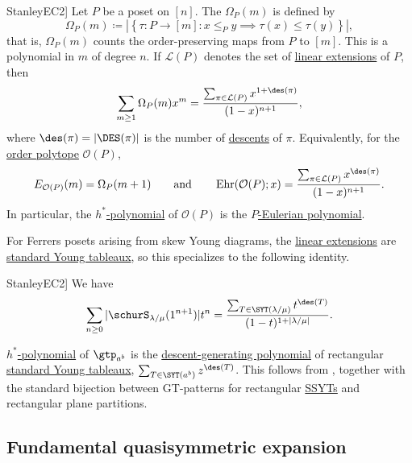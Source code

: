 \begin{proposition}[See \cite[Ch.~7.19]{StanleyEC2}]
Let $P$ be a poset on $[n]$.
The \label{orderPolynomial} $\Omega_P(m)$ is defined by
\[
\Omega_P(m) \coloneqq
\left| \left\{ \tau:P\to [m] : x \leq_P y \implies
\tau(x)\leq \tau(y) \right\}\right|,
\]
that is, $\Omega_P(m)$ counts the order-preserving maps from $P$ to $[m]$.
This is a polynomial in $m$ of degree $n$.
If $\mathcal{L}(P)$ denotes the set of
\hyperref[linearExtension]{linear extensions} of $P$, then
\[
\sum_{m\geq 1} \Omega_P(m) x^m
=
\frac{\sum_{\pi \in \mathcal{L}(P)} x^{1+\des(\pi)}}{(1-x)^{n+1}},
\]
where $\des(\pi)=|\DES(\pi)|$ is the number of
\hyperref[descentSet]{descents} of $\pi$.
Equivalently, for the \hyperref[orderPolytope]{order polytope} $\mathcal{O}(P)$,
\[
E_{\mathcal{O}(P)}(m)=\Omega_P(m+1)
\qquad \text{and} \qquad
\operatorname{Ehr}(\mathcal{O}(P);x)
=
\frac{\sum_{\pi \in \mathcal{L}(P)} x^{\des(\pi)}}{(1-x)^{n+1}}.
\]
In particular, the \hyperref[hStarPolynomial]{$h^*$-polynomial} of
$\mathcal{O}(P)$ is the \hyperref[pEulerianPolynomial]{$P$-Eulerian
polynomial}.
\end{proposition}

For Ferrers posets arising from skew Young diagrams, the
\hyperref[linearExtension]{linear extensions} are
\hyperref[standardYoungTableau]{standard Young tableaux}, so this specializes
to the following identity.

\begin{proposition}[See \cite[Ch.~7.19]{StanleyEC2}]
We have
 \[
 \sum_{n\geq 0} |\schurS_{\lambda/\mu}(1^{n+1})| t^n =
  \frac{ \sum_{T \in \SYT(\lambda/\mu)} t^{\des(T)} }
  {(1-t)^{1+|\lambda/\mu|}}.
 \]
\end{proposition}

\begin{remark}
\hyperref[hStarPolynomial]{$h^*$-polynomial} of $\gtp_{a^b}$ is the
\hyperref[descentSet]{descent-generating polynomial} of rectangular
\hyperref[standardYoungTableau]{standard Young tableaux},
$\sum_{T \in \SYT(a^b)} z^{\des(T)}$.
This follows from \cite[Eqs.~(7.96), (7.108)]{StanleyEC2}, together with the
standard bijection between GT-patterns for rectangular
\hyperref[semistandardYoungTableau]{SSYTs} and rectangular plane partitions.
\end{remark}




\subsection[pPartitionInGessel]{Fundamental quasisymmetric expansion}

